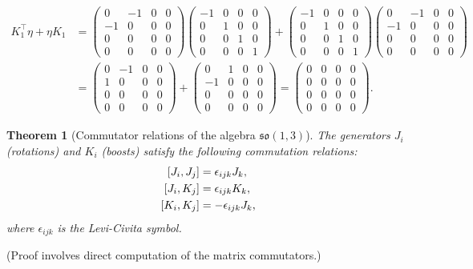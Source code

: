\documentclass{amsart}
\newtheorem{theorem}{Theorem}[section]
\theoremstyle{definition}
\theoremstyle{remark}
\begin{document}
\begin{align*}
K_1^\top \eta + \eta K_1 &=
\begin{pmatrix} 0&-1&0&0 \\ -1&0&0&0 \\ 0&0&0&0 \\ 0&0&0&0 \end{pmatrix}
\begin{pmatrix} -1&0&0&0 \\ 0&1&0&0 \\ 0&0&1&0 \\ 0&0&0&1 \end{pmatrix}
+
\begin{pmatrix} -1&0&0&0 \\ 0&1&0&0 \\ 0&0&1&0 \\ 0&0&0&1 \end{pmatrix}
\begin{pmatrix} 0&-1&0&0 \\ -1&0&0&0 \\ 0&0&0&0 \\ 0&0&0&0 \end{pmatrix} \\
&=
\begin{pmatrix} 0&-1&0&0 \\ 1&0&0&0 \\ 0&0&0&0 \\ 0&0&0&0 \end{pmatrix}
+
\begin{pmatrix} 0&1&0&0 \\ -1&0&0&0 \\ 0&0&0&0 \\ 0&0&0&0 \end{pmatrix}
=
\begin{pmatrix} 0&0&0&0 \\ 0&0&0&0 \\ 0&0&0&0 \\ 0&0&0&0 \end{pmatrix}.
\end{align*}

\begin{theorem}[Commutator relations of the algebra $\mathfrak{so}(1,3)$]\label{thm:so13_algebra_commutation_relations}
  The generators $J_i$ (rotations) and $K_i$ (boosts) satisfy the following commutation relations:
  \begin{align*}
    \relax [J_i, J_j] &= \epsilon_{ijk} J_k, \\
    \relax [J_i, K_j] &= \epsilon_{ijk} K_k, \\
    \relax [K_i, K_j] &= -\epsilon_{ijk} J_k,
  \end{align*}
  where $\epsilon_{ijk}$ is the Levi-Civita symbol.
\end{theorem}
(Proof involves direct computation of the matrix commutators.)
\end{document}
